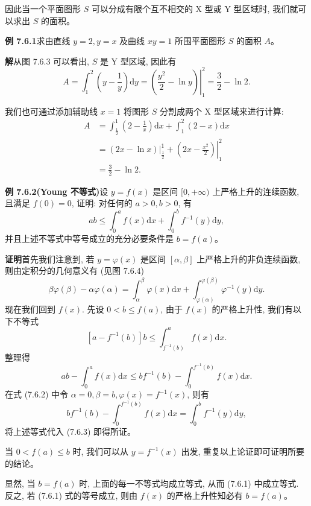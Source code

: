 \documentclass[UTF8,12pt,a4paper,fontset=fandol]{ctexart}
\begin{document}
因此当一个平面图形 $S$ 可以分成有限个互不相交的 X 型或 Y 型区域时, 我们就可以求出 $S$ 的面积。

\noindent\textbf{例 7.6.1}\quad 求由直线 $y=2,y=x$ 及曲线 $xy=1$ 所围平面图形 $S$ 的面积 $A$。

\noindent\textbf{解}\quad 从图 7.6.3 可以看出, $S$ 是 Y 型区域, 因此有
\[
  A=\int_1^2\left(y-\frac{1}{y}\right)\mathrm dy
  =\left.\left(\frac{y^2}{2}-\ln y\right)\right|_1^2
  =\frac{3}{2}-\ln2.
\]

我们也可通过添加辅助线 $x=1$ 将图形 $S$ 分割成两个 X 型区域来进行计算:
\[
\begin{aligned}
  A&=\int_{\frac12}^1\left(2-\frac{1}{x}\right)\mathrm dx+\int_1^2(2-x)\mathrm dx\\
  &=\left.(2x-\ln x)\right|_{\frac12}^1
  +\left.\left(2x-\frac{x^2}{2}\right)\right|_1^2\\
  &=\frac{3}{2}-\ln2.
\end{aligned}
\]

\noindent\textbf{例 7.6.2(Young 不等式)}\quad 设 $y=f(x)$ 是区间 $[0,+\infty)$ 上严格上升的连续函数, 且满足 $f(0)=0$, 证明: 对任何的 $a>0,b>0$, 有
\begin{equation}
  ab\leq\int_0^a f(x)\mathrm dx+\int_0^b f^{-1}(y)\mathrm dy,
  \tag{7.6.1}
\end{equation}
并且上述不等式中等号成立的充分必要条件是 $b=f(a)$。

\noindent\textbf{证明}\quad 首先我们注意到, 若 $y=\varphi(x)$ 是区间 $[\alpha,\beta]$ 上严格上升的非负连续函数, 则由定积分的几何意义有 (见图 7.6.4)
\begin{equation}
  \beta\varphi(\beta)-\alpha\varphi(\alpha)
  =\int_\alpha^\beta \varphi(x)\mathrm dx
  +\int_{\varphi(\alpha)}^{\varphi(\beta)}\varphi^{-1}(y)\mathrm dy.
  \tag{7.6.2}
\end{equation}
现在我们回到 $f(x)$. 先设 $0<b\leq f(a)$, 由于 $f(x)$ 的严格上升性, 我们有以下不等式
\[
  [a-f^{-1}(b)]b\leq\int_{f^{-1}(b)}^a f(x)\mathrm dx.
\]
整理得
\begin{equation}
  ab-\int_0^a f(x)\mathrm dx
  \leq bf^{-1}(b)-\int_0^{f^{-1}(b)}f(x)\mathrm dx.
  \tag{7.6.3}
\end{equation}
在式 (7.6.2) 中令 $\alpha=0,\beta=b,\varphi(x)=f^{-1}(x)$, 则有
\[
  bf^{-1}(b)-\int_0^{f^{-1}(b)}f(x)\mathrm dx
  =\int_0^b f^{-1}(y)\mathrm dy,
\]
将上述等式代入 (7.6.3) 即得所证。

当 $0<f(a)\leq b$ 时, 我们可以从 $y=f^{-1}(x)$ 出发, 重复以上论证即可证明所要的结论。

显然, 当 $b=f(a)$ 时, 上面的每一不等式均成立等式, 从而 (7.6.1) 中成立等式. 反之, 若 (7.6.1) 式的等号成立, 则由 $f(x)$ 的严格上升性知必有 $b=f(a)$。
\end{document}
